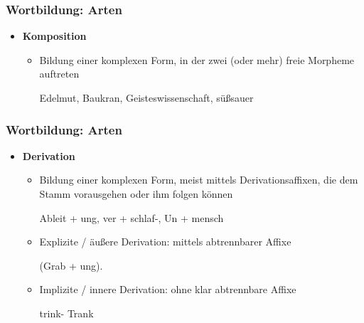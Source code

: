 \begin{frame}
\frametitle{Wortbildung: Arten}

\begin{itemize}
	\item \textbf{Komposition}
	
	\begin{itemize}
		\item Bildung einer komplexen Form, in der zwei (oder mehr) freie Morpheme auftreten
		
		\ea Edelmut, Baukran, Geisteswissenschaft, süßsauer
		\z
		
	\end{itemize}

\end{itemize}

\end{frame}

\begin{frame}
\frametitle{Wortbildung: Arten}
	
\begin{itemize}
	\item \textbf{Derivation}
	
	\begin{itemize}
		\item Bildung einer komplexen Form, meist mittels Derivationsaffixen, die dem Stamm vorausgehen oder ihm folgen können
		
		\ea Ableit + ung, ver + schlaf-, Un + mensch
		\z
		
		\item Explizite / äußere Derivation: mittels abtrennbarer Affixe
		
		\ea (Grab + ung).
		\z
		
		\item Implizite / innere Derivation: ohne klar abtrennbare Affixe
		
		\ea trink- \vs Trank
		\z
		
	\end{itemize}
\end{itemize}

\end{frame}

